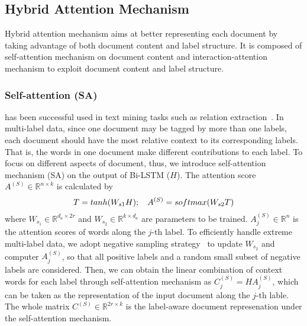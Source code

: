\documentclass[runningheads]{llncs}
\newenvironment{sequation}{\begin{equation}\small}{\end{equation}}
\begin{document}
\vspace{-4mm}
\subsection{Hybrid Attention Mechanism}
Hybrid attention mechanism aims at better representing each document by taking advantage of both document content and label structure. It is composed of self-attention mechanism on document content and interaction-attention mechanism to exploit document content and label structure.
\vspace{-4mm}
\subsubsection{Self-attention (SA)} has been successful used in text mining tasks such as relation extraction~\cite{ref_article31}. In multi-label data, since one document may be tagged by more than one labels, each document should have the most relative context to its corresponding labels. That is, the words in one document make different contributions to each label. To focus on different aspects of document, thus, we introduce self-attention mechanism (SA) \cite{ref_article16} on the output of Bi-LSTM ($H$). The attention score $A^{(S)}\in { \mathbb{R} }^{ n\times k}$ is calculated by 
\begin{sequation}
T=tanh({W}_{s1}H); \quad {A}^{(S)} =softmax({W}_{s2}T)
\end{sequation}
where ${ W }_{ { s }_{ 1 } }\in { \mathbb{R} }^{ { d }_{ a }\times 2r }$ and ${ W }_{ { s }_{ 2 } }\in { \mathbb{R} }^{ k\times { d }_{ a } }$ are parameters to be trained. 
$A^{(S)}_j\in{ \mathbb{R} }^{ n }$ is the attention scores of words along the $j$-th label. To efficiently handle extreme multi-label data, we adopt negative sampling strategy~\cite{ref_article12} to update ${ W }_{ { s }_{ 2 } }$ and computer $A^{(S)}_j$, so that all positive labels and a random small subset of negative labels are considered. 
Then, we can obtain the linear combination of context words for each label through self-attention mechanism as ${C}^{(S)}_j=H A^{(S)}_j$, which can be taken as the representation of the input document along the $j$-th lable. The whole matrix $C^{(S)}\in \mathbb{R}^{2r\times k}$ is the label-aware document represenation under the self-attention mechanism.



\vspace{-2mm}
\end{document}
